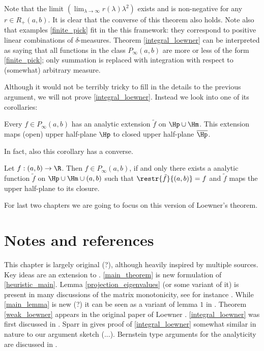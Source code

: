 Note that the limit $\left(\lim_{\lambda \to \infty} r(\lambda) \lambda^2 \right)$ exists and is non-negative for any $r \in R_{+}(a, b)$. It is clear that the converse of this theorem also holds. Note also that examples \ref{finite_pick} fit in the this framework: they correspond to positive linear combinations of $\delta$-measures. Theorem \ref{integral_loewner} can be interpreted as saying that all functions in the class $P_{\infty}(a, b)$ are more or less of the form \ref{finite_pick}; only summation is replaced with integration with respect to (somewhat) arbitrary measure.

Although it would not be terribly tricky to fill in the details to the previous argument, we will not prove \ref{integral_loewner}. Instead we look into one of its corollaries:

\begin{kor}
	Every $f \in P_{\infty}(a, b)$ has an analytic extension $\tilde{f}$ on $\Hp \cup \Hm$. This extension maps (open) upper half-plane $\Hp$ to closed upper half-plane $\overline{\Hp}$.
\end{kor}

In fact, also this corollary has a converse.

\begin{lause}\label{weak_loewner}
	Let $f : (a, b) \to \R$. Then $f \in P_{\infty}(a, b)$, if and only there exists a analytic function $\tilde{f}$ on $\Hp \cup \Hm \cup (a, b)$ such that $\restr{\tilde{f}}{(a, b)} = f$ and $\tilde{f}$ maps the upper half-plane to its closure.
\end{lause}

For last two chapters we are going to focus on this version of Loewner's theorem.

\section{Notes and references}

This chapter is largely original (?), although heavily inspired by multiple sources. Key ideas are an extension to \cite{Heina}. \ref{main_theorem} is new formulation of \ref{heuristic_main}. Lemma \ref{projection_eigenvalues} (or some variant of it) is present in many discussions of the matrix monotonicity, see for instance \cite{Don}. While \ref{main_lemma} is new (?) it can be seen as a variant of lemma $1$ in \cite{Sparr}. Theorem \ref{weak_loewner} appears in the original paper of Loewner \cite{Low}. \ref{integral_loewner} was first discussed in \cite{Ben}. Sparr in \cite{Sparr} gives proof of \ref{integral_loewner} somewhat similar in nature to our argument sketch (...). Bernstein type arguments for the analyticity are discussed in \cite{Ben}.

